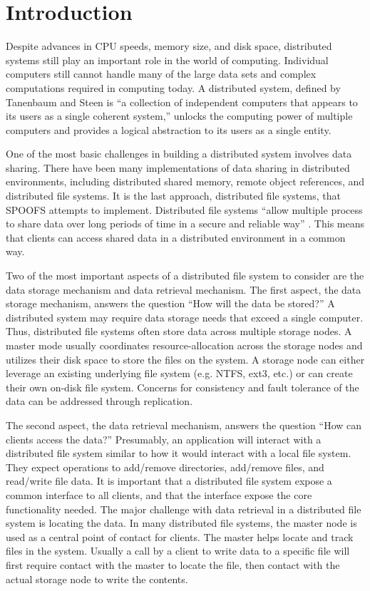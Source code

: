 
\section{Introduction}
\label{sec:introduction}

Despite advances in CPU speeds, memory size, and disk space, distributed systems still play an important role in the world of computing.  Individual computers still cannot handle many of the large data sets and complex computations required in computing today.  A distributed system, defined by Tanenbaum and Steen \cite{tanenbaum_text06} is ``a collection of independent computers that appears to its users as a single coherent system,'' unlocks the computing power of multiple computers and provides a logical abstraction to its users as a single entity.

One of the most basic challenges in building a distributed system involves data sharing.  There have been many implementations of data sharing in distributed environments, including distributed shared memory, remote object references, and distributed file systems.  It is the last approach, distributed file systems, that SPOOFS attempts to implement.  Distributed file systems ``allow multiple process to share data over long periods of time in a secure and reliable way'' \cite{tanenbaum_text06}.  This means that clients can access shared data in a distributed environment in a common way.

Two of the most important aspects of a distributed file system to consider are the data storage mechanism and data retrieval mechanism.  The first aspect, the data storage mechanism, answers the question ``How will the data be stored?''  A distributed system may require data storage needs that exceed a single computer.  Thus, distributed file systems often store data across multiple storage nodes.  A master mode usually coordinates resource-allocation across the storage nodes and utilizes their disk space to store the files on the system.  A storage node can either leverage an existing underlying file system (e.g. NTFS, ext3, etc.) or can create their own on-disk file system.  Concerns for consistency and fault tolerance of the data can be addressed through replication.

The second aspect, the data retrieval mechanism, answers the question ``How can clients access the data?''  Presumably, an application will interact with a distributed file system similar to how it would interact with a local file system.  They expect operations to add/remove directories, add/remove files, and read/write file data.  It is important that a distributed file system expose a common interface to all clients, and that the interface expose the core functionality needed.  The major challenge with data retrieval in a distributed file system is locating the data.  In many distributed file systems, the master node is used as a central point of contact for clients.  The master helps locate and track files in the system.  Usually a call by a client to write data to a specific file will first require contact with the master to locate the file, then contact with the actual storage node to write the contents.

